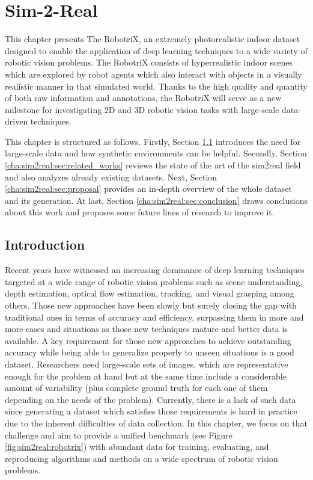 \chapter{Sim-2-Real}
\label{cha:sim2real}

\begin{chapterabstract}
    This chapter presents The RobotriX, an extremely photorealistic indoor dataset designed to enable the application of deep learning techniques to a wide variety of robotic vision problems. The RobotriX consists of hyperrealistic indoor scenes which are explored by robot agents which also interact with objects in a visually realistic manner in that simulated world. Thanks to the high quality and quantity of both raw information and annotations, the RobotriX will serve as a new milestone for investigating 2D and 3D robotic vision tasks with large-scale data-driven techniques.

    This chapter is structured as follows. Firstly, Section \ref{cha:sim2real:sec:introduction} introduces the need for large-scale data and how synthetic environments can be helpful. Secondly, Section \ref{cha:sim2real:sec:related_works} reviews the state of the art of the sim2real field and also analyzes already existing datasets. Next, Section \ref{cha:sim2real:sec:proposal} provides an in-depth overview of the whole dataset and its generation. At last, Section \ref{cha:sim2real:sec:conclusion} draws conclusions about this work and proposes some future lines of research to improve it.
\end{chapterabstract}

\minitoc

\clearpage

\section{Introduction}
\label{cha:sim2real:sec:introduction}

Recent years have witnessed an increasing dominance of deep learning techniques targeted at a wide range of robotic vision problems such as scene understanding, depth estimation, optical flow estimation, tracking, and visual grasping among others. Those new approaches have been slowly but surely closing the gap with traditional ones in terms of accuracy and efficiency, surpassing them in more and more cases and situations as those new techniques mature and better data is available. A key requirement for those new approaches to achieve outstanding accuracy while being able to generalize properly to unseen situations is a good dataset. Researchers need large-scale sets of images, which are representative enough for the problem at hand but at the same time include a considerable amount of variability (plus complete ground truth for each one of them depending on the needs of the problem). Currently, there is a lack of such data since generating a dataset which satisfies those requirements is hard in practice due to the inherent difficulties of data collection. In this chapter, we focus on that challenge and aim to provide a unified benchmark (see Figure \ref{fig:sim2real:robotrix}) with abundant data for training, evaluating, and reproducing algorithms and methods on a wide spectrum of robotic vision problems.


